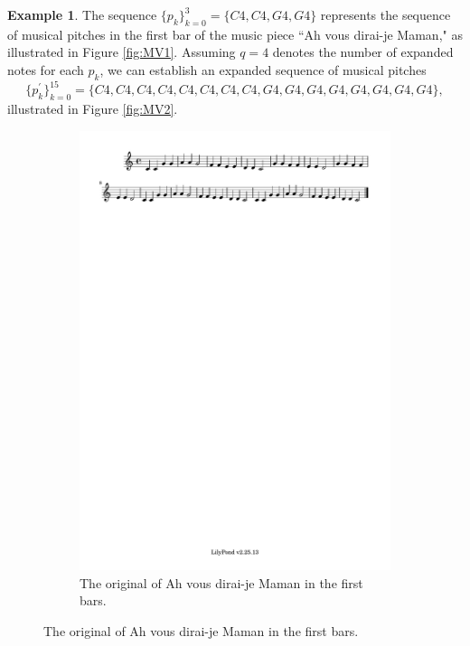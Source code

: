 \documentclass[11pt]{article}
\theoremstyle{definition}
\newtheorem{example}[theorem]{Example}
\begin{document}
\begin{example}
\label{ex: MV}
The sequence $ \{p_k\}_{k=0}^{3} = \{ C4, C4, G4, G4 \} $ represents the sequence of musical pitches in the first bar of the music piece ``Ah vous dirai-je Maman," as illustrated in Figure \ref{fig:MV1}.
Assuming $q = 4$ denotes the number of expanded notes for each $p_k$, we can establish an expanded sequence of musical pitches 
\[\{p^\prime_k\}_{k=0}^{15} = \{ C4, C4, C4, C4, C4, C4, C4, C4, G4, G4, G4, G4, G4, G4, G4, G4 \}, \] 
illustrated in Figure \ref{fig:MV2}.
\end{example}

\begin{figure}
\centering
\begin{subfigure}{\textwidth}
\centering
\includegraphics[trim=1cm 26.5cm 14.325cm 0.02cm, clip, scale=0.8]{dabby_1.pdf} %
\caption{The original of Ah vous dirai-je Maman in the first bars.}

\end{subfigure}
\end{figure}
\end{document}
